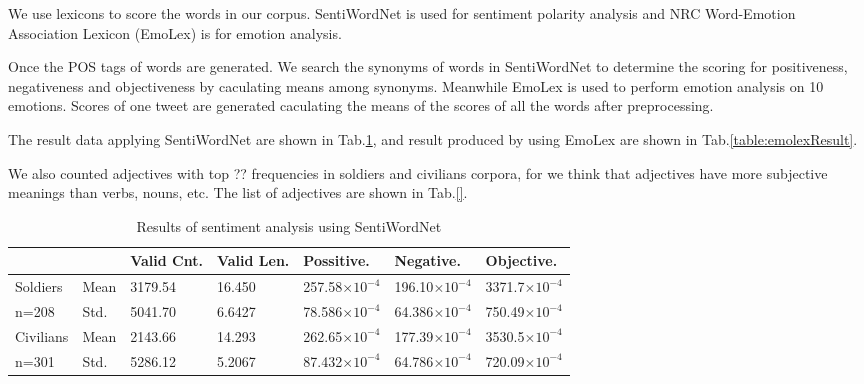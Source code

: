 We use lexicons to score the words in our corpus.
SentiWordNet is used for sentiment polarity analysis and NRC Word-Emotion Association Lexicon (EmoLex) \citep{Mohammad13} is for emotion analysis.

Once the POS tags of words are generated. We search the synonyms of words in SentiWordNet to determine the scoring for positiveness, negativeness and objectiveness by caculating means among synonyms. Meanwhile EmoLex is used to perform emotion analysis on 10 emotions. Scores of one tweet are generated caculating the means of the scores of all the words after preprocessing.

The result data applying SentiWordNet are shown in Tab.\ref{table:sentiResult}, and result produced by using EmoLex are shown in Tab.\ref{table:emolexResult}.

We also counted adjectives with top ?? frequencies in soldiers and civilians corpora, for we think that adjectives have more subjective meanings than verbs, nouns, etc. The list of adjectives are shown in Tab.\ref{}.


\begin{table}[h]
  \caption{Results of sentiment analysis using SentiWordNet}
  \label{table:sentiResult}
  \centering
  \renewcommand{\tabularxcolumn}{m} %
  \begin{tabularx}{\textwidth}{l l | l l l l l}
    \toprule
              &         & \textbf{Valid Cnt.} & \textbf{Valid Len.}    & \textbf{Possitive.}    & \textbf{Negative.}     & \textbf{Objective.}
    \tabularnewline \midrule
    Soldiers  & Mean
              & 3179.54 & 16.450              & 257.58$\times 10^{-4}$ & 196.10$\times 10^{-4}$ & 3371.7$\times 10^{-4}$
    \tabularnewline
    n=208     & Std.
              & 5041.70 & 6.6427              & 78.586$\times 10^{-4}$ & 64.386$\times 10^{-4}$ & 750.49$\times 10^{-4}$
    \tabularnewline \hline \hline
    Civilians & Mean
              & 2143.66 & 14.293              & 262.65$\times 10^{-4}$ & 177.39$\times 10^{-4}$ & 3530.5$\times 10^{-4}$
    \tabularnewline
    n=301     & Std.
              & 5286.12 & 5.2067              & 87.432$\times 10^{-4}$ & 64.786$\times 10^{-4}$ & 720.09$\times 10^{-4}$
    \tabularnewline \bottomrule
  \end{tabularx}
\end{table}


